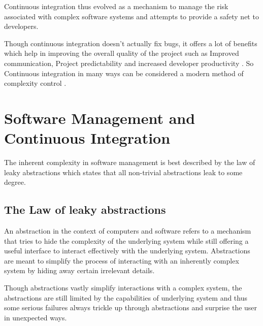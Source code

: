 \documentclass[12pt,conference]{IEEEtran}
\begin{document}
Continuous integration thus evolved as a mechanism to manage the risk associated with complex software systems \cite{zaytsev_increasing_2013} and  attempts to provide a safety net \cite{fowler_continuous_2006} to developers. 

Though continuous integration doesn't actually fix bugs, it offers a lot of benefits which help in improving the overall quality of the project such as Improved communication, Project predictability and increased developer productivity \cite{sta_ahl_experienced_2013}. So Continuous integration in many ways can be considered a modern method of complexity control \cite{beck_extreme_2000}.

\section*{Software Management and Continuous Integration}

The inherent complexity in software management is best described by the law of leaky abstractions \cite{spolsky_law_2002} which states that all non-trivial abstractions leak to some degree. 

\subsection*{The Law of leaky abstractions}

An abstraction in the context of computers and software refers to a mechanism that tries to hide the complexity of the underlying system while still offering a useful interface to interact effectively with the underlying system. Abstractions are meant to simplify the process of interacting with an inherently complex system by hiding away certain irrelevant details.

Though abstractions vastly simplify interactions with a complex system, the abstractions are still limited by the capabilities of underlying system and  thus some serious failures always trickle up through abstractions and surprise the user in unexpected ways.
\end{document}
